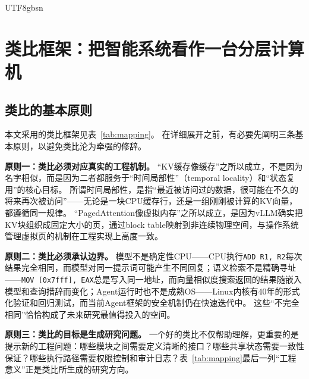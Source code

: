 \documentclass[11pt,a4paper]{article}
\begin{document}
\begin{CJK*}{UTF8}{gbsn}
\section{类比框架：把智能系统看作一台分层计算机}
\label{sec:framework}

\subsection{类比的基本原则}

本文采用的类比框架见表~\ref{tab:mapping}。
在详细展开之前，有必要先阐明三条基本原则，以避免类比沦为牵强的修辞。

\textbf{原则一：类比必须对应真实的工程机制。}
``KV缓存像缓存''之所以成立，不是因为名字相似，而是因为二者都服务于``时间局部性''（temporal locality）和``状态复用''的核心目标\cite{drepper2007memory,kwon2023pagedattention}。
所谓时间局部性，是指``最近被访问过的数据，很可能在不久的将来再次被访问''——无论是一块CPU缓存行，还是一组刚刚被计算的KV向量，都遵循同一规律。
``PagedAttention像虚拟内存''之所以成立，是因为vLLM确实把KV块组织成固定大小的页，通过block table映射到非连续物理空间，与操作系统管理虚拟页的机制在工程实现上高度一致\cite{kwon2023pagedattention}。

\textbf{原则二：类比必须承认边界。}
模型不是确定性CPU——CPU执行\texttt{ADD R1, R2}每次结果完全相同，而模型对同一提示词可能产生不同回复；语义检索不是精确寻址——\texttt{MOV [0x7fff], EAX}总是写入同一地址，而向量相似度搜索返回的结果随嵌入模型和查询措辞而变化；Agent运行时也不是成熟OS——Linux内核有40年的形式化验证和回归测试，而当前Agent框架的安全机制仍在快速迭代中。
这些``不完全相同''恰恰构成了未来研究最值得投入的空间。

\textbf{原则三：类比的目标是生成研究问题。}
一个好的类比不仅帮助理解，更重要的是提示新的工程问题：哪些模块之间需要定义清晰的接口？哪些共享状态需要一致性保证？哪些执行路径需要权限控制和审计日志？表~\ref{tab:mapping}最后一列``工程意义''正是类比所生成的研究方向。


\end{CJK*}
\end{document}
